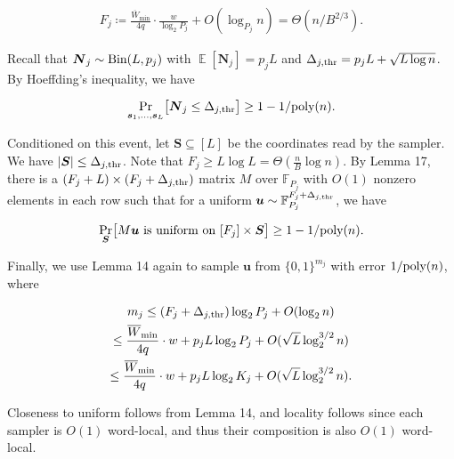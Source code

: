 \documentclass[10pt,a4paper]{article}
\begin{document}
\[\begin{gathered}
F_{j}\coloneq\frac{\overline{W}_{\min}}{4q}\cdot\frac{w}{\log_{2}P_{j}}+O(\log_{P_{j}}n)=\Theta(n/B^{2/3}).
\end{gathered}\]




Recall that $\boldsymbol{N}_{j}\sim\textnormal{Bin}(L,p_{j})$ with $\operatorname{\mathbb{E}}[\boldsymbol{N}_{j}]=p_{j}L$ and $\Delta_{j,{\rm thr}}=p_{j}L+\sqrt{L\log n}$.
By Hoeffding’s inequality, we have\par


\[\begin{gathered}
\Pr_{\boldsymbol{s}_{1},\ldots,\boldsymbol{s}_{L}}\bigl[\boldsymbol{N}_{j}\leq\Delta_{j,{\rm thr}}\bigr]\geq 1-1/\textnormal{poly}(n).
\end{gathered}\]


Conditioned on this event, let $\boldsymbol{S}\subseteq[L]$ be the coordinates read by the sampler.
We have $\lvert\boldsymbol{S}\rvert\leq\Delta_{j,{\rm thr}}$.
Note that $F_{j}\geq L\log L=\Theta(\tfrac{n}{B}\log n)$.
By Lemma 17, there is a $(F_{j}+L)\times(F_{j}+\Delta_{j,{\rm thr}})$ matrix $M$ over $\mathbb{F}_{P_{j}}$ with $O(1)$ nonzero elements in each row such that for a uniform $\boldsymbol{u}\sim\mathbb{F}_{P_{j}}^{F_{j}+\Delta_{j,{\rm thr}}}$, we have\par


\[\begin{gathered}
\Pr_{\boldsymbol{S}}\bigl[\text{$M\boldsymbol{u}$ is uniform on $[F_{j}]\times\boldsymbol{S}$}\bigr]\geq 1-1/\textnormal{poly}(n).
\end{gathered}\]


Finally, we use Lemma 14 again to sample $\boldsymbol{u}$ from $\{0,1\}^{m_{j}}$ with error $1/\textnormal{poly}(n)$, where\par


\[\begin{gathered}
\displaystyle m_{j} \displaystyle\leq(F_{j}+\Delta_{j,{\rm thr}})\log_{2}P_{j}+O(\log_{2}n) \\
\displaystyle\leq\frac{\overline{W}_{\min}}{4q}\cdot w+p_{j}L\log_{2}P_{j}+O(\sqrt{L}\log_{2}^{3/2}n) \\
\displaystyle\leq\frac{\overline{W}_{\min}}{4q}\cdot w+p_{j}L\log_{2}K_{j}+O(\sqrt{L}\log_{2}^{3/2}n).
\end{gathered}\]


Closeness to uniform follows from Lemma 14, and locality follows since each sampler is $O(1)$ word-local, and thus their composition is also $O(1)$ word-local.\par
\end{document}
